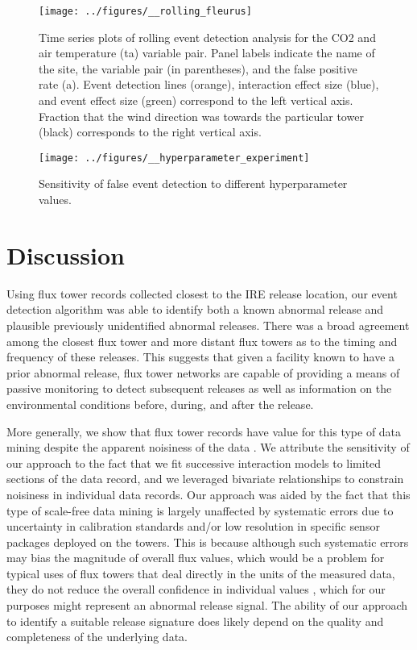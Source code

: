 \documentclass{article}
\begin{document}
\begin{figure}
	\centering
	\texttt{[image: ../figures/\_\_rolling\_fleurus]}
	\caption{Time series plots of rolling event detection analysis for the CO2 and air temperature (ta) variable pair. Panel labels indicate the name of the site, the variable pair (in parentheses), and the false positive rate (a). Event detection lines (orange), interaction effect size (blue), and event effect size (green) correspond to the left vertical axis. Fraction that the wind direction was towards the particular tower (black) corresponds to the right vertical axis.}
	\label{fig:rolling}
\end{figure}

\begin{figure}
	\centering
	\texttt{[image: ../figures/\_\_hyperparameter\_experiment]}
	\caption{Sensitivity of false event detection to different hyperparameter values.}
	\label{fig:hyperparameter}
\end{figure}

\section{Discussion}
Using flux tower records collected closest to the IRE release location, our event detection algorithm was able to identify both a known abnormal release and plausible previously unidentified abnormal releases. There was a broad agreement among the closest flux tower and more distant flux towers as to the timing and frequency of these releases. This suggests that given a facility known to have a prior abnormal release, flux tower networks are capable of providing a means of passive monitoring to detect subsequent releases as well as information on the environmental conditions before, during, and after the release. 

More generally, we show that flux tower records have value for this type of data mining despite the apparent noisiness of the data \citep{fratiniEddyCovarianceFlux2018}. We attribute the sensitivity of our approach to the fact that we fit successive interaction models to limited sections of the data record, and we leveraged bivariate relationships to constrain noisiness in individual data records. Our approach was aided by the fact that this type of scale-free data mining is largely unaffected by systematic errors due to uncertainty in calibration standards and/or low resolution in specific sensor packages deployed on the towers. This is because although such systematic errors may bias the magnitude of overall flux values, which would be a problem for typical uses of flux towers that deal directly in the units of the measured data, they do not reduce the overall confidence in individual values \citep{langfordEddycovarianceDataLow2015}, which for our purposes might represent an abnormal release signal. The ability of our approach to identify a suitable release signature does likely depend on the quality and completeness of the underlying data.
\end{document}
